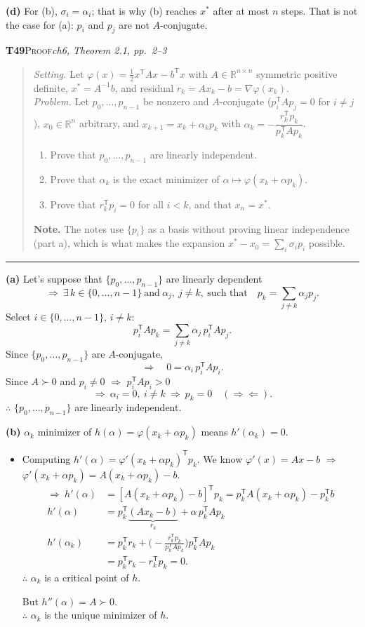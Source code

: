 \documentclass[11pt,a4paper]{article}
\newcommand{\T}{^{\mathsf T}}
\newcommand{\task}[3]{\par\medskip\noindent\textbf{#1}\quad\textsc{#2}\hfill\textit{#3}\par\smallskip}
\newenvironment{statement}{\begin{quote}\small}{\end{quote}\vspace{-0.3em}\noindent\textcolor{gray}{\rule{\linewidth}{0.6pt}}\par\medskip}
\begin{document}
\textbf{(d)} For (b), $\sigma_i=\alpha_i$; that is why (b) reaches $x^*$ after at most $n$ steps.
That is not the case for (a): $p_i$ and $p_j$ are not $A$-conjugate.

\task{T49}{Proof}{ch6, Theorem 2.1, pp.\ 2--3}
\begin{statement}
\emph{Setting.} Let $\varphi(x)=\tfrac12x\T Ax-b\T x$ with $A\in\mathbb R^{n\times n}$ symmetric positive definite, $x^*=A^{-1}b$, and residual $r_k=Ax_k-b=\nabla\varphi(x_k)$.\\
\emph{Problem.} Let $p_0,\dots,p_{n-1}$ be nonzero and $A$-conjugate ($p_i\T Ap_j=0$ for $i\neq j$), $x_0\in\mathbb R^n$ arbitrary, and $x_{k+1}=x_k+\alpha_kp_k$ with $\alpha_k=-\dfrac{r_k\T p_k}{p_k\T Ap_k}$.
\begin{enumerate}[label=\alph*)]
\item Prove that $p_0,\dots,p_{n-1}$ are linearly independent.
\item Prove that $\alpha_k$ is the exact minimizer of $\alpha\mapsto\varphi(x_k+\alpha p_k)$.
\item Prove that $r_k\T p_i=0$ for all $i<k$, and that $x_n=x^*$.
\end{enumerate}
\textbf{Note.} The notes use $\{p_i\}$ as a basis without proving linear independence (part a), which is what makes the expansion $x^*-x_0=\sum_i\sigma_ip_i$ possible.
\end{statement}

\textbf{(a)} Let's suppose that $\{p_0,\dots,p_{n-1}\}$ are linearly dependent
\[
\Rightarrow\ \exists\,k\in\{0,\dots,n-1\}\ \text{and}\ \alpha_j,\ j\neq k,\ \text{such that}\quad
p_k=\sum_{j\neq k}\alpha_jp_j .
\]
Select $i\in\{0,\dots,n-1\}$, $i\neq k$:
\[
p_i\T Ap_k=\sum_{j\neq k}\alpha_j\,p_i\T Ap_j .
\]
Since $\{p_0,\dots,p_{n-1}\}$ are $A$-conjugate,
\[
\Rightarrow\quad 0=\alpha_i\,p_i\T Ap_i .
\]
Since $A\succ0$ and $p_i\neq0$ $\Rightarrow$ $p_i\T Ap_i>0$
\[
\Rightarrow\ \alpha_i=0,\ i\neq k\ \Rightarrow\ p_k=0\quad(\Rightarrow\!\Leftarrow).
\]
$\therefore$ $\{p_0,\dots,p_{n-1}\}$ are linearly independent.

\textbf{(b)} $\alpha_k$ minimizer of $h(\alpha)=\varphi(x_k+\alpha p_k)$ means $h'(\alpha_k)=0$.
\begin{itemize}
\item Computing $h'(\alpha)=\varphi'(x_k+\alpha p_k)\T p_k$. We know $\varphi'(x)=Ax-b$
$\Rightarrow$ $\varphi'(x_k+\alpha p_k)=A(x_k+\alpha p_k)-b$.
\begin{align*}
\Rightarrow\ h'(\alpha)&=[A(x_k+\alpha p_k)-b]\T p_k
=p_k\T A(x_k+\alpha p_k)-p_k\T b\\
h'(\alpha)&=p_k\T\underbrace{(Ax_k-b)}_{r_k}+\alpha\,p_k\T Ap_k\\
h'(\alpha_k)&=p_k\T r_k+\Big(-\frac{r_k\T p_k}{p_k\T Ap_k}\Big)p_k\T Ap_k\\
&=p_k\T r_k-r_k\T p_k=0 .
\end{align*}
$\therefore$ $\alpha_k$ is a critical point of $h$.

But $h''(\alpha)=A\succ0$.\\
$\therefore$ $\alpha_k$ is the unique minimizer of $h$.
\end{itemize}
\end{document}
